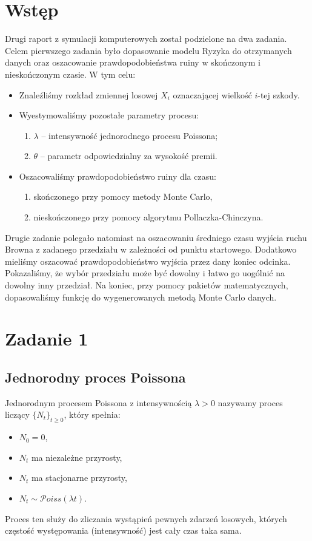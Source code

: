 \documentclass[12pt]{mwart}
\begin{document}
	\section{Wstęp}
	\noindent Drugi raport z symulacji komputerowych został podzielone na dwa zadania. Celem pierwszego zadania było dopasowanie modelu Ryzyka do otrzymanych danych oraz oszacowanie prawdopodobieństwa ruiny w skończonym i nieskończonym czasie. W tym celu:
	\begin{itemize}[leftmargin=10mm, label=\small$\bullet$]
		\item Znaleźliśmy rozkład zmiennej losowej $X_i$ oznaczającej wielkość $i$-tej szkody.
		\item Wyestymowaliśmy pozostałe parametry procesu:
		\begin{enumerate}[leftmargin=10mm]
			\item $\lambda$ -- intensywność jednorodnego procesu Poissona;
			\item $\theta$ -- parametr odpowiedzialny za wysokość premii.
		\end{enumerate}
		\item Oszacowaliśmy prawdopodobieństwo ruiny dla czasu:
		\begin{enumerate}[leftmargin=10mm]
			\item skończonego przy pomocy metody Monte Carlo,
			\item nieskończonego przy pomocy algorytmu Pollaczka-Chinczyna.
		\end{enumerate}
	\end{itemize}
	\noindent Drugie zadanie polegało natomiast na oszacowaniu średniego czasu wyjścia ruchu Browna z zadanego przedziału w zależności od punktu startowego. Dodatkowo mieliśmy oszacować prawdopodobieństwo wyjścia przez dany koniec odcinka. Pokazaliśmy, że wybór przedziału może być dowolny i łatwo go uogólnić na dowolny inny przedział. Na koniec, przy pomocy pakietów matematycznych, dopasowaliśmy funkcję do wygenerowanych metodą Monte Carlo danych.
	
	
	
	\section{Zadanie 1}

	\subsection{Jednorodny proces Poissona}
	
	\noindent Jednorodnym procesem Poissona z intensywnością $\lambda > 0$ nazywamy proces liczący $\{N_t\}_{t \geq 0}$, który spełnia:
	\begin{itemize}[leftmargin=10mm, label={\small$\bullet$}]
		\item $N_0 = 0$,
		\item $N_t$ ma niezależne przyrosty,
		\item $N_t$ ma stacjonarne przyrosty,
		\item $N_t \sim \mathcal{P}oiss(\lambda t)$.
	\end{itemize}
	Proces ten służy do zliczania wystąpień pewnych zdarzeń losowych, których częstość występowania (intensywność) jest cały czas taka sama.\\
	
\end{document}
